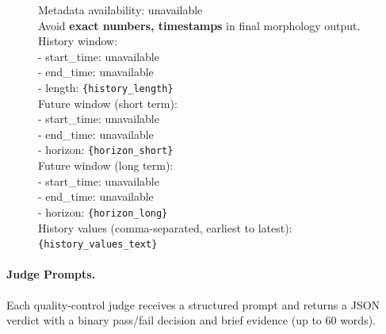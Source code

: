 \documentclass[11pt]{article}
\begin{document}
\begin{figure}[htbp]
\begin{tcolorbox}[
  boxrule=0.25pt,
  colback=promptBgSystem,
  colframe=black,
  colbacktitle=promptBgTitle,
  coltitle=black,
  title={Prompt: User (Metadata Unavailable)},
  fonttitle=\bfseries,
  fontupper=\small
]
Metadata availability: unavailable \\

Avoid \textbf{exact numbers, timestamps} in final morphology output. \\

History window: \\
\quad - start\_time: unavailable \\
\quad - end\_time: unavailable \\
\quad - length: \texttt{\{history\_length\}} \\

Future window (short term): \\
\quad - start\_time: unavailable \\
\quad - end\_time: unavailable \\
\quad - horizon: \texttt{\{horizon\_short\}} \\

Future window (long term): \\
\quad - start\_time: unavailable \\
\quad - end\_time: unavailable \\
\quad - horizon: \texttt{\{horizon\_long\}} \\

History values (comma-separated, earliest to latest): \\
\texttt{\{history\_values\_text\}}
\end{tcolorbox}
\end{figure}

\paragraph{Judge Prompts.}
Each quality-control judge receives a structured prompt and returns a JSON verdict with a binary pass/fail decision and brief evidence (up to 60 words).
\end{document}
